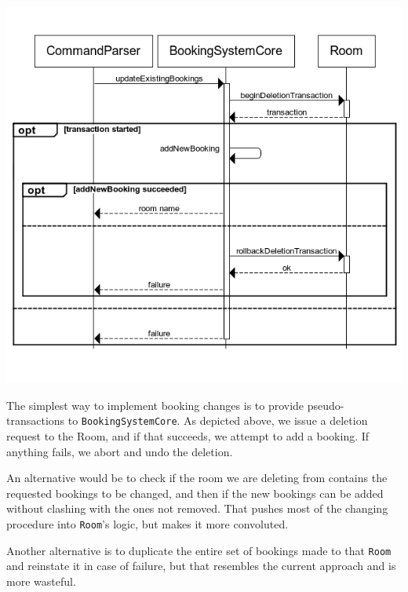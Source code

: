 \documentclass[a4paper,11pt]{article}
\begin{document}
\includegraphics[scale=0.7]{../uml/sequence-bookings-change.png}

The simplest way to implement booking changes is to provide pseudo-transactions
to \texttt{BookingSystemCore}. As depicted above, we issue a deletion request to
the Room, and if that succeeds, we attempt to add a booking. If anything fails,
we abort and undo the deletion.

An alternative would be to check if the room we are deleting from contains the
requested bookings to be changed, and then if the new bookings can be added
without clashing with the ones not removed. That pushes most of the changing
procedure into \texttt{Room}'s logic, but makes it more convoluted.

Another alternative is to duplicate the entire set of bookings made to that
\texttt{Room} and reinstate it in case of failure, but that resembles the
current approach and is more wasteful.
\end{document}
